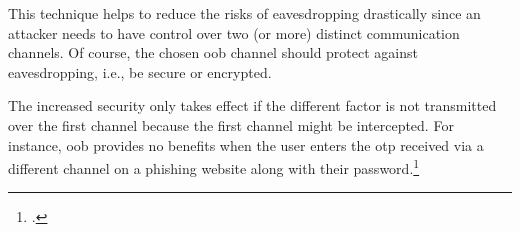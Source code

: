 This technique helps to reduce the risks of eavesdropping drastically since an attacker needs to have control over two (or more) distinct communication channels. Of course, the chosen \gls{oob} channel should protect against eavesdropping, i.e., be secure or encrypted.

The increased security only takes effect if the different factor is not transmitted over the first channel because the first channel might be intercepted. For instance, \gls{oob} provides no benefits when the user enters the \gls{otp} received via a different channel on a phishing website along with their password.\footcites[See][17]{SP80063B}[See][441]{doi:10.1002/9781118256107.ch37}[See][140]{brotherston2017defensive}[See][106]{2241278}
